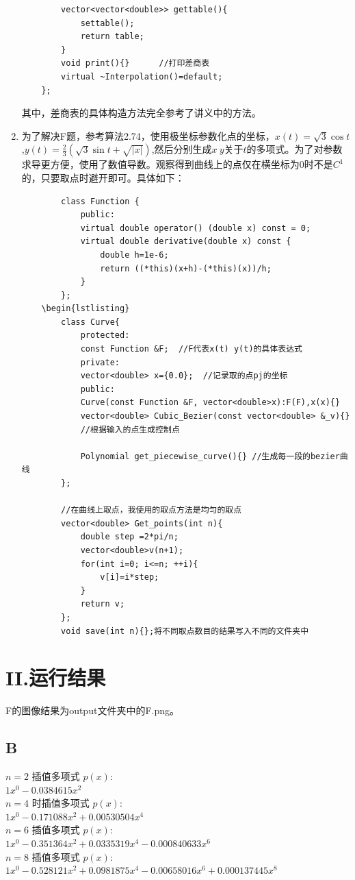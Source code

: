 \documentclass[a4paper]{article}
\begin{document}
\begin{enumerate}
\begin{lstlisting}
		vector<vector<double>> gettable(){
			settable();
			return table;
		}
		void print(){}    	//打印差商表
		virtual ~Interpolation()=default; 
	};
\end{lstlisting}
	其中，差商表的具体构造方法完全参考了讲义中的方法。
	\item 
	为了解决F题，参考算法2.74，使用极坐标参数化点的坐标，$x(t)=\sqrt{3}\cos t$,$y(t)=\frac{2}{3}(\sqrt{3}\sin t +\sqrt{|x|})$,然后分别生成$x\: y$关于$t$的多项式。为了对参数求导更方便，使用了数值导数。观察得到曲线上的点仅在横坐标为0时不是$C^1$的，只要取点时避开即可。具体如下：
	\begin{lstlisting}
		class Function {
			public:
			virtual double operator() (double x) const = 0;
			virtual double derivative(double x) const {
				double h=1e-6;
				return ((*this)(x+h)-(*this)(x))/h;
			}
		};
	\begin{lstlisting}
		class Curve{
			protected:
			const Function &F;  //F代表x(t) y(t)的具体表达式
			private:
			vector<double> x={0.0};  //记录取的点pj的坐标
			public:
			Curve(const Function &F, vector<double>x):F(F),x(x){}
			vector<double> Cubic_Bezier(const vector<double> &_v){} 
			//根据输入的点生成控制点
			
			Polynomial get_piecewise_curve(){} //生成每一段的bezier曲线
		};
		
		//在曲线上取点，我使用的取点方法是均匀的取点
		vector<double> Get_points(int n){
			double step =2*pi/n;
			vector<double>v(n+1);
			for(int i=0; i<=n; ++i){
				v[i]=i*step;
			}
			return v;
		};
		void save(int n){};将不同取点数目的结果写入不同的文件夹中
	\end{lstlisting}
\end{enumerate}
\section*{II.运行结果}
F的图像结果为output文件夹中的F.png。
\subsection*{B}
\begin{tcolorbox}[colback=gray!10, colframe=gray!80!black]
	\( n=2 \) 插值多项式 \( p(x) \): \\
	\( 1x^0 - 0.0384615x^2 \) \\
	\( n=4 \) 时插值多项式 \( p(x) \): \\
	\( 1x^0 - 0.171088x^2 + 0.00530504x^4 \) \\
	\( n=6 \) 插值多项式 \( p(x) \): \\
	\( 1x^0 - 0.351364x^2 + 0.0335319x^4 - 0.000840633x^6 \) \\
	\( n=8 \) 插值多项式 \( p(x) \): \\
	\( 1x^0 - 0.528121x^2 + 0.0981875x^4 - 0.00658016x^6 + 0.000137445x^8 \) \\
\end{tcolorbox}
\end{document}
